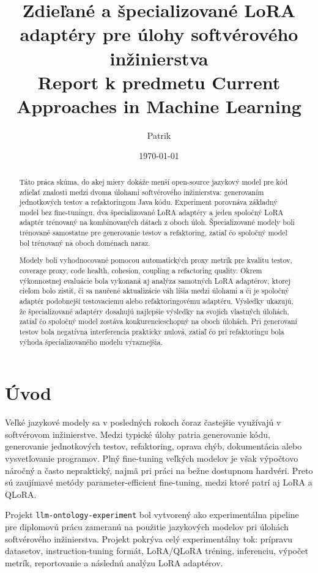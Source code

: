 \documentclass[11pt,a4paper]{article}
\title{
\textbf{Zdieľané a špecializované LoRA adaptéry pre úlohy softvérového inžinierstva}\\
\large Report k predmetu Current Approaches in Machine Learning
}
\author{Patrik}
\date{\today}
\newcommand{\projectname}{\texttt{llm-ontology-experiment}}
\begin{document}
\maketitle

\begin{abstract}
Táto práca skúma, do akej miery dokáže menší open-source jazykový model pre kód zdieľať znalosti medzi dvoma úlohami softvérového inžinierstva: generovaním jednotkových testov a refaktoringom Java kódu. Experiment porovnáva základný model bez fine-tuningu, dva špecializované LoRA adaptéry a jeden spoločný LoRA adaptér trénovaný na kombinovaných dátach z oboch úloh. Špecializované modely boli trénované samostatne pre generovanie testov a refaktoring, zatiaľ čo spoločný model bol trénovaný na oboch doménach naraz.

Modely boli vyhodnocované pomocou automatických proxy metrík pre kvalitu testov, coverage proxy, code health, cohesion, coupling a refactoring quality. Okrem výkonnostnej evaluácie bola vykonaná aj analýza samotných LoRA adaptérov, ktorej cieľom bolo zistiť, či sa naučené aktualizácie váh líšia medzi úlohami a či je spoločný adaptér podobnejší testovaciemu alebo refaktoringovému adaptéru. Výsledky ukazujú, že špecializované adaptéry dosahujú najlepšie výsledky na svojich vlastných úlohách, zatiaľ čo spoločný model zostáva konkurencieschopný na oboch úlohách. Pri generovaní testov bola negatívna interferencia prakticky nulová, zatiaľ čo pri refaktoringu bola výhoda špecializovaného modelu výraznejšia.
\end{abstract}

\section{Úvod}

Veľké jazykové modely sa v posledných rokoch čoraz častejšie využívajú v softvérovom inžinierstve. Medzi typické úlohy patria generovanie kódu, generovanie jednotkových testov, refaktoring, oprava chýb, dokumentácia alebo vysvetľovanie programov. Plný fine-tuning veľkých modelov je však výpočtovo náročný a často nepraktický, najmä pri práci na bežne dostupnom hardvéri. Preto sú zaujímavé metódy parameter-efficient fine-tuning, medzi ktoré patrí aj LoRA a QLoRA.

Projekt \projectname{} bol vytvorený ako experimentálna pipeline pre diplomovú prácu zameranú na použitie jazykových modelov pri úlohách softvérového inžinierstva. Projekt pokrýva celý experimentálny tok: prípravu datasetov, instruction-tuning formát, LoRA/QLoRA tréning, inferenciu, výpočet metrík, reportovanie a následnú analýzu LoRA adaptérov.
\end{document}
